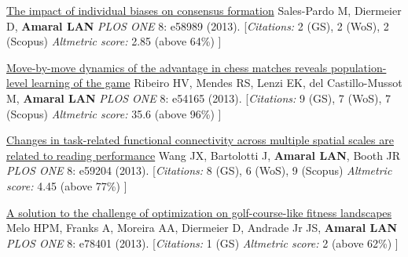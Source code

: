 \NumberedItem{\makebox[0.8cm][r]{[102]}}
\href{/people/amaral/impact-individual-biases-consensus-formation}
{The impact of individual biases on consensus formation}
\newline
Sales-Pardo M, Diermeier D, {\textbf{Amaral LAN}}
\newline
\textit{PLOS ONE}
    8:
e58989 (2013).
    \newline
    \hfill [{\em{Citations:}} 2 (GS),
    2 (WoS), 2 (Scopus)
        {\hspace*{1cm} \em{Altmetric score:}}  2.85 (above 64\%)
    ]
\newline
\Gap
~
\Gap

\NumberedItem{\makebox[0.8cm][r]{[101]}}
\href{/people/amaral/move-move-dynamics-advantage-chess-matches-reveals-population-level-learning-game}
{Move-by-move dynamics of the advantage in chess matches reveals population-level learning of the game}
\newline
Ribeiro HV, Mendes RS, Lenzi EK, del Castillo-Mussot M, {\textbf{Amaral LAN}}
\newline
\textit{PLOS ONE}
    8:
e54165 (2013).
    \newline
    \hfill [{\em{Citations:}} 9 (GS),
    7 (WoS), 7 (Scopus)
        {\hspace*{1cm} \em{Altmetric score:}}  35.6 (above 96\%)
    ]
\newline
\Gap
~
\Gap

\NumberedItem{\makebox[0.8cm][r]{[100]}}
\href{/people/amaral/changes-task-related-functional-connectivity-across-multiple-spatial-scales-are-related-reading-performance}
{Changes in task-related functional connectivity across multiple spatial scales are related to reading performance}
\newline
Wang JX, Bartolotti J, {\textbf{Amaral LAN}}, Booth JR
\newline
\textit{PLOS ONE}
    8:
e59204 (2013).
    \newline
    \hfill [{\em{Citations:}} 8 (GS),
    6 (WoS), 9 (Scopus)
        {\hspace*{1cm} \em{Altmetric score:}}  4.45 (above 77\%)
    ]
\newline
\Gap
~
\Gap

\NumberedItem{\makebox[0.8cm][r]{[99]}}
\href{/people/amaral/solution_to_challenge}
{A solution to the challenge of optimization on golf-course-like fitness landscapes}
\newline
Melo HPM, Franks A, Moreira AA, Diermeier D, Andrade Jr JS, {\textbf{Amaral LAN}}
\newline
\textit{PLOS ONE}
    8:
e78401 (2013).
    \newline
    \hfill [{\em{Citations:}} 1 (GS)
        {\hspace*{1cm} \em{Altmetric score:}}  2 (above 62\%)
    ]
\newline
\Gap
~
\Gap

